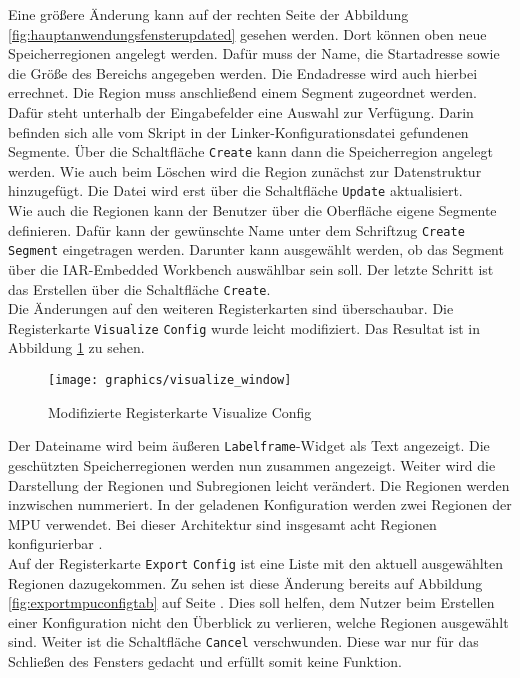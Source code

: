 Eine größere Änderung kann auf der rechten Seite der Abbildung \ref{fig:hauptanwendungsfensterupdated} gesehen werden.
Dort können oben neue Speicherregionen angelegt werden.
Dafür muss der Name, die Startadresse sowie die Größe des Bereichs angegeben werden.
Die Endadresse wird auch hierbei errechnet.
Die Region muss anschließend einem Segment zugeordnet werden.
Dafür steht unterhalb der Eingabefelder eine Auswahl zur Verfügung.
Darin befinden sich alle vom Skript in der Linker-Konfigurationsdatei gefundenen Segmente.
Über die Schaltfläche \verb*|Create| kann dann die Speicherregion angelegt werden.
Wie auch beim Löschen wird die Region zunächst zur Datenstruktur hinzugefügt.
Die Datei wird erst über die Schaltfläche \verb*|Update| aktualisiert. \\

Wie auch die Regionen kann der Benutzer über die Oberfläche eigene Segmente definieren.
Dafür kann der gewünschte Name unter dem Schriftzug \verb*|Create| \verb*|Segment| eingetragen werden.
Darunter kann ausgewählt werden, ob das Segment über die IAR-Embedded Workbench auswählbar sein soll.
Der letzte Schritt ist das Erstellen über die Schaltfläche \verb*|Create|. \\

Die Änderungen auf den weiteren Registerkarten sind überschaubar.
Die Registerkarte \verb*|Visualize| \verb*|Config| wurde leicht modifiziert.
Das Resultat ist in Abbildung \ref{fig:visualizewindow} zu sehen. \\

\begin{figure}[H]
	\centering
	\texttt{[image: graphics/visualize\_window]}
	\caption{Modifizierte Registerkarte Visualize Config}
	\label{fig:visualizewindow}
\end{figure}

Der Dateiname wird beim äußeren \verb*|Labelframe|-Widget als Text angezeigt.
Die geschützten Speicherregionen werden nun zusammen angezeigt.
Weiter wird die Darstellung der Regionen und Subregionen leicht verändert.
Die Regionen werden inzwischen nummeriert.
In der geladenen Konfiguration werden zwei Regionen der \ac{MPU} verwendet.
Bei dieser Architektur sind insgesamt acht Regionen konfigurierbar \cite{cortex_M0+_programming_manual}. \\

Auf der Registerkarte \verb*|Export| \verb*|Config| ist eine Liste mit den aktuell ausgewählten Regionen dazugekommen.
Zu sehen ist diese Änderung bereits auf Abbildung \ref{fig:exportmpuconfigtab} auf Seite \pageref{fig:exportmpuconfigtab}.
Dies soll helfen, dem Nutzer beim Erstellen einer Konfiguration nicht den Überblick zu verlieren, welche Regionen ausgewählt sind.
Weiter ist die Schaltfläche \verb*|Cancel| verschwunden.
Diese war nur für das Schließen des Fensters gedacht und erfüllt somit keine Funktion.


